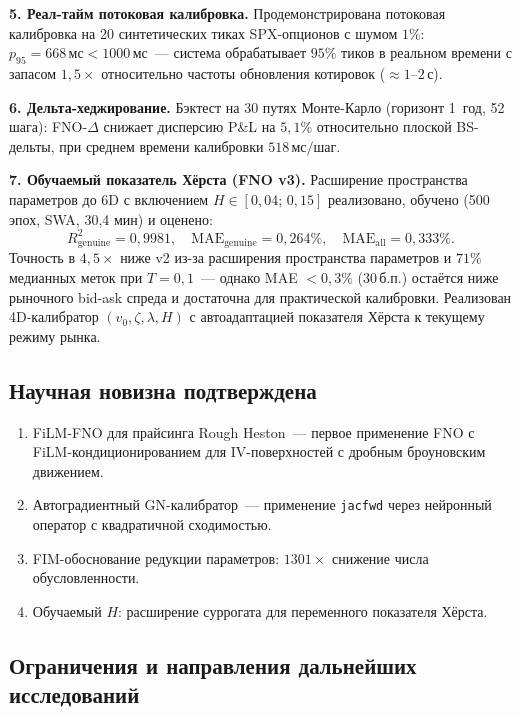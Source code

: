 \medskip
\textbf{5. Реал-тайм потоковая калибровка.}
Продемонстрирована потоковая калибровка на 20 синтетических тиках SPX-опционов
с шумом $1\%$: $p_{95} = 668\,\text{мс} < 1000\,\text{мс}$~--- система
обрабатывает $95\%$ тиков в реальном времени с запасом $1{,}5\times$
относительно частоты обновления котировок ($\approx 1$--$2\,\text{с}$).

\medskip
\textbf{6. Дельта-хеджирование.}
Бэктест на 30 путях Монте-Карло (горизонт 1~год, 52 шага): FNO-$\Delta$
снижает дисперсию P\&L на $5{,}1\%$ относительно плоской BS-дельты,
при среднем времени калибровки $518\,\text{мс/шаг}$.

\medskip
\textbf{7. Обучаемый показатель Хёрста (FNO v3).}
Расширение пространства параметров до 6D с включением $H \in [0{,}04;\,0{,}15]$
реализовано, обучено (500 эпох, SWA, 30{,}4 мин) и оценено:
\[
  R^2_{\text{genuine}} = 0{,}9981, \quad
  \text{MAE}_{\text{genuine}} = 0{,}264\%, \quad
  \text{MAE}_{\text{all}} = 0{,}333\%.
\]
Точность в $4{,}5\times$ ниже v2 из-за расширения пространства параметров
и $71\%$ медианных меток при $T=0{,}1$~--- однако MAE $< 0{,}3\%$ ($30\,\text{б.п.}$)
остаётся ниже рыночного bid-ask спреда и достаточна для практической калибровки.
Реализован 4D-калибратор $(v_0, \zeta, \lambda, H)$ с автоадаптацией
показателя Хёрста к текущему режиму рынка.

\subsection*{Научная новизна подтверждена}

\begin{enumerate}
  \item FiLM-FNO для прайсинга Rough Heston~--- первое применение FNO с
        FiLM-кондиционированием для IV-поверхностей с дробным броуновским движением.
  \item Автоградиентный GN-калибратор~--- применение \texttt{jacfwd} через
        нейронный оператор с квадратичной сходимостью.
  \item FIM-обоснование редукции параметров: $1301\times$ снижение числа
        обусловленности.
  \item Обучаемый $H$: расширение суррогата для переменного показателя Хёрста.
\end{enumerate}

\subsection*{Ограничения и направления дальнейших исследований}

